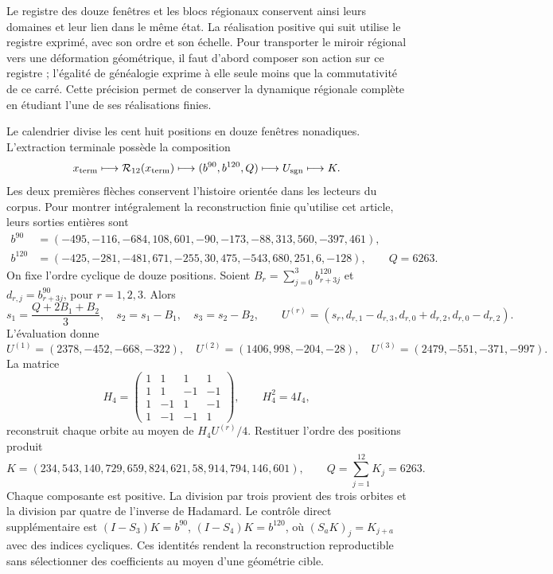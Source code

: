 \documentclass[a4paper,10pt]{article}
\theoremstyle{definition}\newtheorem{definition}[theorem]{Définition}
\theoremstyle{remark}\newtheorem{remark}[theorem]{Remarque}
\numberwithin{equation}{section}
\begin{document}
Le registre des douze fenêtres et les blocs régionaux conservent ainsi leurs domaines et leur lien dans le même état. La réalisation positive qui suit utilise le registre exprimé, avec son ordre et son échelle. Pour transporter le miroir régional vers une déformation géométrique, il faut d'abord composer son action sur ce registre ; l'égalité de généalogie exprime à elle seule moins que la commutativité de ce carré. Cette précision permet de conserver la dynamique régionale complète en étudiant l'une de ses réalisations finies.

Le calendrier divise les cent huit positions en douze fenêtres nonadiques.
L’extraction terminale possède la composition
\[
 x_{\rm term}\longmapsto\mathcal R_{12}(x_{\rm term})
 \longmapsto(b^{90},b^{120},Q)\longmapsto U_{\rm sgn}\longmapsto K.
\]
Les deux premières flèches conservent l'histoire orientée dans les lecteurs du corpus. Pour montrer intégralement la reconstruction finie qu'utilise cet article, leurs sorties entières sont
\begin{align*}
 b^{90}&=(-495,-116,-684,108,601,-90,-173,-88,313,560,-397,461),\\
 b^{120}&=(-425,-281,-481,671,-255,30,475,-543,680,251,6,-128),
 \qquad Q=6263.
\end{align*}
On fixe l’ordre cyclique de douze positions. Soient
\(B_r=\sum_{j=0}^3 b^{120}_{r+3j}\) et
\(d_{r,j}=b^{90}_{r+3j}\), pour \(r=1,2,3\). Alors
\[
 s_1=\frac{Q+2B_1+B_2}{3},\quad s_2=s_1-B_1,\quad s_3=s_2-B_2,
 \qquad
 U^{(r)}=(s_r,d_{r,1}-d_{r,3},d_{r,0}+d_{r,2},d_{r,0}-d_{r,2}).
\]
L’évaluation donne
\[
 U^{(1)}=(2378,-452,-668,-322),\quad
 U^{(2)}=(1406,998,-204,-28),\quad
 U^{(3)}=(2479,-551,-371,-997).
\]
La matrice
\[
 H_4=\begin{pmatrix}1&1&1&1\\1&1&-1&-1\\1&-1&1&-1\\1&-1&-1&1\end{pmatrix},
 \qquad H_4^2=4I_4,
\]
reconstruit chaque orbite au moyen de \(H_4U^{(r)}/4\). Restituer l'ordre des positions produit
\begin{equation}
 K=(234,543,140,729,659,824,621,58,914,794,146,601),
 \qquad Q=\sum_{j=1}^{12}K_j=6263.
 \label{eq:K-main}
\end{equation}
Chaque composante est positive. La division par trois provient des trois
orbites et la division par quatre de l’inverse de Hadamard. Le contrôle
direct supplémentaire est \((I-S_3)K=b^{90}\),
\((I-S_4)K=b^{120}\), où \((S_aK)_j=K_{j+a}\) avec des indices cycliques.
Ces identités rendent la reconstruction reproductible sans sélectionner
des coefficients au moyen d’une géométrie cible.
\end{document}
